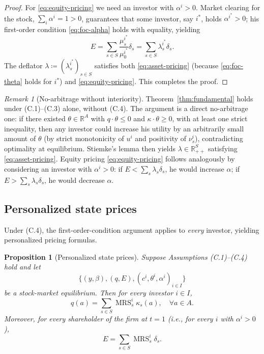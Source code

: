 \documentclass[11pt,a4paper,oneside]{book}
\def\R{\mathbb{R}}
\def\leq{\leqslant}
\def\geq{\geqslant}
\DeclareMathOperator{\MRS}{MRS}
\theoremstyle{plain}
\newtheorem{proposition}[theorem]{Proposition}
\theoremstyle{definition}
\theoremstyle{remark}
\newtheorem{remark}[theorem]{Remark}
\numberwithin{equation}{chapter}
\begin{document}
\begin{proof}
For \eqref{eq:equity-pricing} we need an investor with $\alpha^i > 0$.
Market clearing for the stock, $\sum_i \alpha^i = 1 > 0$, guarantees that some investor, say $i^\ast$, holds $\alpha^{i^\ast} > 0$; his first-order condition \eqref{eq:foc-alpha} holds with equality, yielding
\begin{equation*}
  E = \sum_{s \in S} \frac{\mu^{i^\ast}_s}{\mu^{i^\ast}_0} \delta_s = \sum_{s \in S} \lambda^{i^\ast}_s \delta_s.
\end{equation*}
The deflator $\lambda \coloneqq (\lambda^{i^\ast}_s)_{s \in S}$ satisfies both \eqref{eq:asset-pricing} (because \eqref{eq:foc-theta} holds for $i^\ast$) and \eqref{eq:equity-pricing}.
This completes the proof.
\end{proof}

\begin{remark}[No-arbitrage without interiority]\label{rem:no-arbitrage}
Theorem~\ref{thm:fundamental} holds under (C.1)--(C.3) alone, without (C.4).
The argument is a direct no-arbitrage one: if there existed $\theta \in \R^A$ with $q \cdot \theta \leq 0$ and $\kappa \cdot \theta \geq 0$, with at least one strict inequality, then any investor could increase his utility by an arbitrarily small amount of $\theta$ (by strict monotonicity of $u^i$ and positivity of $\nu^i_s$), contradicting optimality at equilibrium.
Stiemke's lemma then yields $\lambda \in \R_{++}^S$ satisfying \eqref{eq:asset-pricing}.
Equity pricing \eqref{eq:equity-pricing} follows analogously by considering an investor with $\alpha^i > 0$: if $E < \sum_s \lambda_s \delta_s$, he would increase $\alpha$; if $E > \sum_s \lambda_s \delta_s$, he would decrease $\alpha$.
\end{remark}

\subsection{Personalized state prices}

Under (C.4), the first-order-condition argument applies to \emph{every} investor, yielding personalized pricing formulas.

\begin{proposition}[Personalized state prices]\label{prop:personalized}
Suppose Assumptions \textup{(C.1)--(C.4)} hold and let
\begin{equation*}
  \bigl\{ (y, \beta), (q, E), (c^i, \theta^i, \alpha^i)_{i \in I} \bigr\}
\end{equation*}
be a stock-market equilibrium.
Then for every investor $i \in I$,
\begin{equation}\label{eq:personalized-q}
  q(a) = \sum_{s \in S} \MRS^i_s \kappa_s(a), \quad \forall a \in A.
\end{equation}
Moreover, for every shareholder of the firm at $t=1$ (i.e., for every $i$ with $\alpha^i > 0$),
\begin{equation}\label{eq:personalized-E}
  E = \sum_{s \in S} \MRS^i_s \delta_s.
\end{equation}
\end{proposition}
\end{document}
